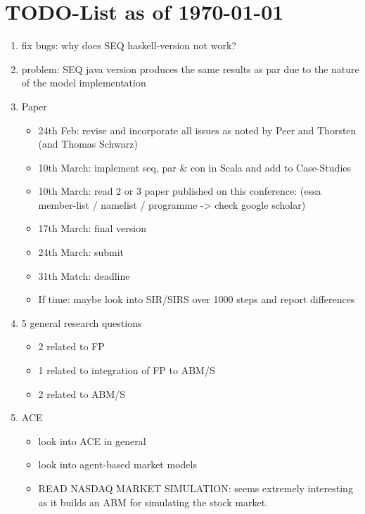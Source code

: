 \section{TODO-List as of \today}

\begin{enumerate}

\item fix bugs: why does SEQ haskell-version not work?

\item problem: SEQ java version produces the same results as par due to the nature of the model implementation

\item Paper
	\begin{itemize}
    \item 24th Feb: revise and incorporate all issues as noted by Peer and Thorsten (and Thomas Schwarz)
    \item 10th March: implement seq, par \& con in Scala and add to Case-Studies
    \item 10th March: read 2 or 3 paper published on this conference: (essa member-list / namelist / programme -> check google scholar)
    \item 17th March: final version
    \item 24th March: submit 
    \item 31th Match: deadline
    \item If time: maybe look into SIR/SIRS over 1000 steps and report differences
    \end{itemize}
    
\item 5 general research questions
	\begin{itemize}
    \item 2 related to FP
    \item 1 related to integration of FP to ABM/S
    \item 2 related to ABM/S
    \end{itemize}
    
\item ACE
	\begin{itemize}
    \item look into ACE in general
    \item look into agent-based market models
	\item READ NASDAQ MARKET SIMULATION: seems extremely interesting as it builds an ABM for simulating the stock market.
	\end{itemize}
	 

\end{enumerate}

